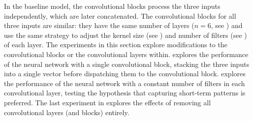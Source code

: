 
In the baseline model, the convolutional blocks process the
three inputs independently, which are later concatenated.
The convolutional blocks for all three inputs are similar:
they have the same number of layers ($n=6$, see
) and use the
same strategy to adjust the kernel size (see
) and number of filters (see
) of each layer. The
experiments in this section explore modifications to the
convolutional blocks or the convolutional layers within.
 explores the
performance of the neural network with a single
convolutional block, stacking the three inputs into a single
vector before dispatching them to the convolutional block.
 explores the
performance of the neural network with a constant number of
filters in each convolutional layer, testing the hypothesis
that capturing short-term patterns is preferred. The last
experiment in  explores
the effects of removing all convolutional layers (and
blocks) entirely.
